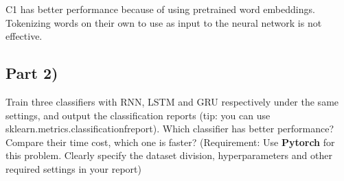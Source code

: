 \documentclass[conference]{IEEEtran}
\begin{document}
C1 has better performance because of using pretrained word embeddings. Tokenizing words on their own to use as input to the neural network is not effective.

\subsection{Part 2)}
\par \noindent Train three classifiers with RNN, LSTM and GRU respectively under the same settings, and output the classification reports (tip: you can use sklearn.metrics.classification\textunderscore freport). Which classifier has better performance? Compare their time cost, which one is faster? (Requirement: Use \textbf{Pytorch} for this problem. Clearly specify the dataset division, hyperparameters and other required settings in your report)
\end{document}
